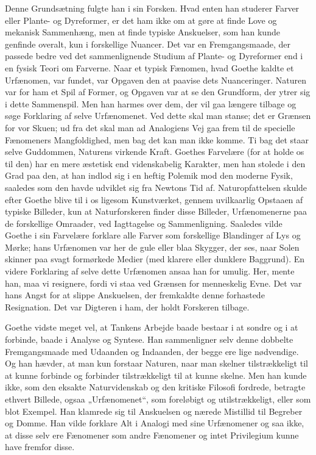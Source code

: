 \documentclass[12pt,a4paper,openany]{book}
\newcommand{\opage}[1]{\marginnote{\footnotesize\textit{[#1]}}}
\begin{document}
Denne Grundsætning fulgte han i sin Forsken. Hvad enten
han studerer Farver eller Plante- og Dyreformer, er det ham
ikke om at gøre at finde Love og mekanisk Sammenhæng, men
at finde typiske Anskuelser, som han kunde genfinde overalt,
kun i forskellige Nuancer. Det var en Fremgangsmaade, der
passede bedre ved det sammenlignende Studium af Plante- og
Dyreformer end i en fysisk Teori om Farverne. Naar et typisk
Fænomen, hvad Goethe kaldte et Urfænomen, var fundet, var
Opgaven den at paavise dets Nuanceringer. Naturen var for
ham et Spil af Former, og Opgaven var at se den Grundform,
der ytrer sig i dette Sammenspil. Men han harmes over dem,
der vil gaa længere tilbage og søge Forklaring af selve Urfænomenet.
Ved dette skal man stanse; det er Grænsen for
vor Skuen; ud fra det skal man ad Analogiens Vej gaa frem
til de specielle Fænomeners Mangfoldighed, men bag det kan
man ikke komme. Ti bag det staar selve Guddommen, Naturens
virkende Kraft. Goethes Farvelære (for at holde os til den)
har en mere æstetisk end videnskabelig Karakter, men han
stolede i den Grad paa den, at han indlod sig i en heftig
Polemik mod den moderne Fysik, saaledes som den havde udviklet
sig fra Newtons Tid af. Naturopfattelsen skulde efter
Goethe blive til i os ligesom Kunstværket, gennem uvilkaarlig
Opstaaen af typiske Billeder, kun at Naturforskeren finder disse
Billeder, Urfænomenerne paa de forskellige Omraader, ved Iagttagelse
og Sammenligning. Saaledes vilde Goethe i sin Farvelære
forklare alle Farver som forskellige Blandinger af Lys og
Mørke; hans Urfænomen var her de gule eller blaa Skygger,
der ses, naar Solen skinner paa svagt formørkede Medier (med
klarere eller dunklere Baggrund). En videre Forklaring af selve
dette Urfænomen ansaa han for umulig. Her, mente han, maa
vi resignere, fordi vi staa ved Grænsen for menneskelig Evne.
Det var hans Angst for at slippe Anskuelsen, der fremkaldte
denne forhastede Resignation. Det var Digteren i ham, der
holdt Forskeren tilbage.

\setcounter{footnote}{0}%
\opage{172}Goethe vidste meget vel, at Tankens Arbejde baade bestaar
i at sondre og i at forbinde, baade i Analyse og Syntese.
Han sammenligner selv denne dobbelte Fremgangsmaade med
Udaanden og Indaanden, der begge ere lige nødvendige. Og
han hævder, at man kun forstaar Naturen, naar man skelner
tilstrækkeligt til at kunne forbinde og forbinder tilstrækkeligt
til at kunne skelne. Men han kunde ikke, som den eksakte
Naturvidenskab og den kritiske Filosofi fordrede, betragte ethvert
Billede, ogsaa „Urfænomenet“, som foreløbigt og utilstrækkeligt,
eller som blot Exempel. Han klamrede sig til Anskuelsen
og nærede Mistillid til Begreber og Domme. Han
vilde forklare Alt i Analogi med sine Urfænomener og saa
ikke, at disse selv ere Fænomener som andre Fænomener og
intet Privilegium kunne have fremfor disse.
\end{document}
